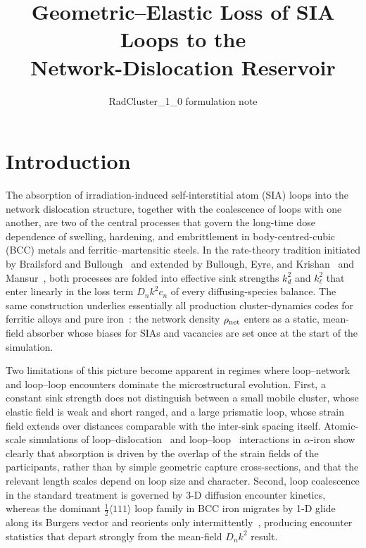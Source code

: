 \documentclass[11pt,a4paper]{article}
\title{Geometric--Elastic Loss of SIA Loops to the\\Network-Dislocation Reservoir}
\author{RadCluster\_1\_0 formulation note}
\date{}
\begin{document}
\maketitle

\section*{Introduction}

The absorption of irradiation-induced self-interstitial atom (SIA) loops
into the network dislocation structure, together with the coalescence of
loops with one another, are two of the central processes that govern the
long-time dose dependence of swelling, hardening, and embrittlement in
body-centred-cubic (BCC) metals and ferritic--martensitic steels.  In
the rate-theory tradition initiated by Brailsford and
Bullough~\citep{Brailsford1972} and extended by Bullough, Eyre, and
Krishan~\citep{Bullough1975} and Mansur~\citep{Mansur1993}, both
processes are folded into effective sink strengths $k_d^2$ and
$k_\ell^2$ that enter linearly in the loss term $D_n k^2 c_n$ of every
diffusing-species balance.  The same construction underlies essentially
all production cluster-dynamics codes for ferritic alloys and pure
iron~\citep{GhoniemCho1979,HardouinDuparc2002,StollerGolubov2008,%
BarashevGolubov2009,KohnertWirth2018}: the network density
$\rho_{\rm net}$ enters as a static, mean-field absorber whose biases
for SIAs and vacancies are set once at the start of the simulation.

Two limitations of this picture become apparent in regimes where
loop--network and loop--loop encounters dominate the microstructural
evolution.  First, a constant sink strength does not distinguish between
a small mobile cluster, whose elastic field is weak and short ranged,
and a large prismatic loop, whose strain field extends over distances
comparable with the inter-sink spacing itself.  Atomic-scale simulations
of loop--dislocation~\citep{BaconOsetsky2009,Terentyev2010} and
loop--loop~\citep{Marian2002} interactions in $\alpha$-iron show clearly
that absorption is driven by the overlap of the strain fields of the
participants, rather than by simple geometric capture cross-sections,
and that the relevant length scales depend on loop size and character.
Second, loop coalescence in the standard treatment is governed by
3-D diffusion encounter kinetics, whereas the dominant
$\tfrac{1}{2}\langle 111\rangle$ loop family in BCC iron migrates by
1-D glide along its Burgers vector and reorients only
intermittently~\citep{TrinkausSingh1992,SinghForemanTrinkaus1997},
producing encounter statistics that depart strongly from the mean-field
$D_n k^2$ result.
\end{document}
